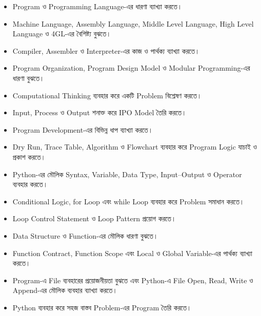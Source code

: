 \begin{learningbox}

\begin{itemize}
\item Program ও Programming Language-এর ধারণা ব্যাখ্যা করতে।
\item Machine Language, Assembly Language, Middle Level Language, High Level Language ও 4GL-এর বৈশিষ্ট্য বুঝতে।
\item Compiler, Assembler ও Interpreter-এর কাজ ও পার্থক্য ব্যাখ্যা করতে।
\item Program Organization, Program Design Model ও Modular Programming-এর ধারণা বুঝতে।
\item Computational Thinking ব্যবহার করে একটি Problem বিশ্লেষণ করতে।
\item Input, Process ও Output শনাক্ত করে IPO Model তৈরি করতে।
\item Program Development-এর বিভিন্ন ধাপ ব্যাখ্যা করতে।
\item Dry Run, Trace Table, Algorithm ও Flowchart ব্যবহার করে Program Logic যাচাই ও প্রকাশ করতে।
\item Python-এর মৌলিক Syntax, Variable, Data Type, Input--Output ও Operator ব্যবহার করতে।
\item Conditional Logic, \textenglish{\ttfamily for} Loop এবং \textenglish{\ttfamily while} Loop ব্যবহার করে Problem সমাধান করতে।
\item Loop Control Statement ও Loop Pattern প্রয়োগ করতে।
\item Data Structure ও Function-এর মৌলিক ধারণা বুঝতে।
\item Function Contract, Function Scope এবং Local ও Global Variable-এর পার্থক্য ব্যাখ্যা করতে।
\item Program-এ File ব্যবহারের প্রয়োজনীয়তা বুঝতে এবং Python-এ File Open, Read, Write ও Append-এর মৌলিক ব্যবহার ব্যাখ্যা করতে।
\item Python ব্যবহার করে সহজ বাস্তব Problem-এর Program তৈরি করতে।
\end{itemize}

\end{learningbox}

